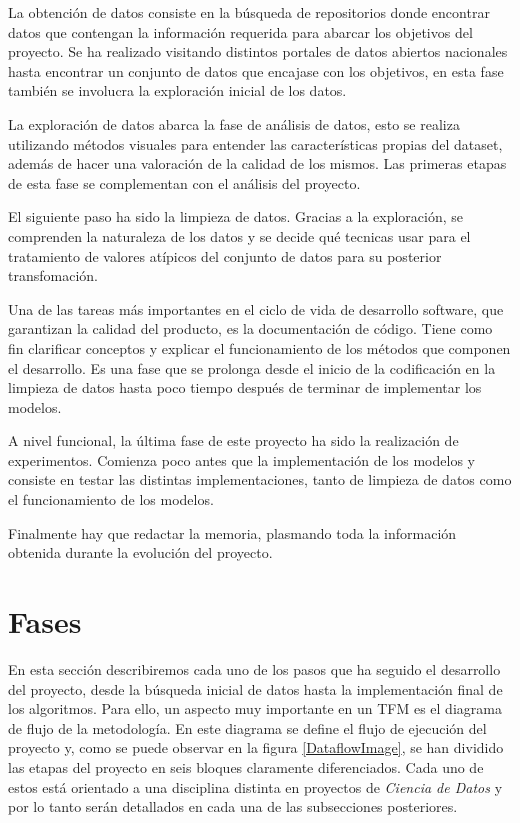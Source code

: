 La obtención de datos consiste en la búsqueda de repositorios donde encontrar datos que contengan la información requerida para abarcar los objetivos del proyecto. Se ha realizado visitando distintos portales de datos abiertos nacionales hasta encontrar un conjunto de datos que encajase con los objetivos, en esta fase también se involucra la exploración inicial de los datos.

La exploración de datos abarca la fase de análisis de datos, esto se realiza utilizando métodos visuales para entender las características propias del dataset, además de hacer una valoración de la calidad de los mismos. Las primeras etapas de esta fase se complementan con el análisis del proyecto.

El siguiente paso ha sido la limpieza de datos. Gracias a la exploración, se comprenden la naturaleza de los datos y se decide qué tecnicas usar para el tratamiento de valores atípicos del conjunto de datos para su posterior transfomación.

Una de las tareas más importantes en el ciclo de vida de desarrollo software, que garantizan la calidad del producto, es la documentación de código. Tiene como fin
clarificar conceptos y explicar el funcionamiento de los métodos que componen el desarrollo. Es una fase que se prolonga desde el inicio de la codificación en la limpieza de datos hasta poco tiempo después de terminar de implementar los modelos.

A nivel funcional, la última fase de este proyecto ha sido la realización de experimentos. Comienza poco antes que la implementación de los modelos y consiste en testar las distintas implementaciones, tanto de limpieza de datos como el funcionamiento de los modelos.

Finalmente hay que redactar la memoria, plasmando toda la información obtenida durante la evolución del proyecto.



\section{Fases}

    En esta sección describiremos cada uno de los pasos que ha seguido el desarrollo del proyecto, desde la búsqueda inicial de datos hasta la implementación final de los algoritmos. Para ello, un aspecto muy importante en un TFM es el diagrama de flujo de la metodología. En este diagrama se define el flujo de ejecución del proyecto y, como se puede observar en la figura \eqref{DataflowImage}, se han dividido las etapas del proyecto en seis bloques claramente diferenciados. Cada uno de estos está orientado a una disciplina distinta en proyectos de \textit{Ciencia de Datos} y por lo tanto serán detallados en cada una de las subsecciones posteriores.


